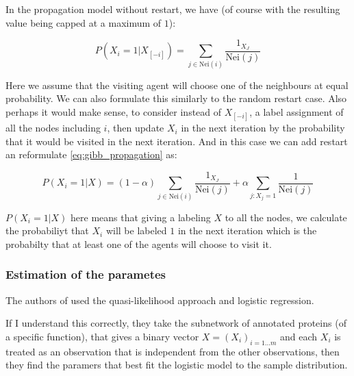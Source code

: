 \documentclass[a4paper,10pt]{article}
\theoremstyle{definition}
\theoremstyle{remark}
\theoremstyle{plain}
\begin{document}
In the propagation model without restart, we have (of course with 
the resulting
value being capped at a maximum of $1$):

\begin{equation}
\label{eq:gibb_propagation}
P(X_i=1 | X_{[-i]}) = 
\sum_{j \in \text{Nei}(i)} \frac{1_{X_J}}{\text{Nei}(j)}
\end{equation}

Here we assume that the visiting agent will choose one of the neighbours at
equal probability. We can also formulate this similarly to the random restart
case. Also perhaps it would make sense, to consider instead of $X_{[-i]}$, a
label assignment of all the nodes including $i$, then update $X_i$ in the next
iteration by the probability that it would be visited in the next iteration.
And in this case we can add restart an reformulate \eqref{eq:gibb_propagation}
as: 

\begin{equation}
\label{eq:gibb_propagation_restart}
P(X_i=1 | X) = 
(1-\alpha) \sum_{j \in \text{Nei}(i)} \frac{1_{X_J}}{\text{Nei}(j)}
+ \alpha \sum_{j : X_j=1} \frac{1}{\text{Nei}(j)}
\end{equation}

$P(X_i=1 | X)$ here means that giving a labeling $X$ to all the nodes, we
calculate the probabiliyt that $X_i$ will be labeled $1$ in the next iteration
which is the probabilty that at least one of the agents will choose to visit it.


\subsubsection{Estimation of the parametes}
The authors of \textcite{deng2002prediction} used the quasi-likelihood
approach and logistic regression.

If I understand this correctly, they take the subnetwork of annotated proteins
(of a specific function), that gives a binary vector $X = (X_i)_{i=1 \dots m}$
and each $X_i$ is treated as an observation that is independent from the other
observations, then they find the paramers that best fit the logistic model to
the sample distribution.

\end{document}
